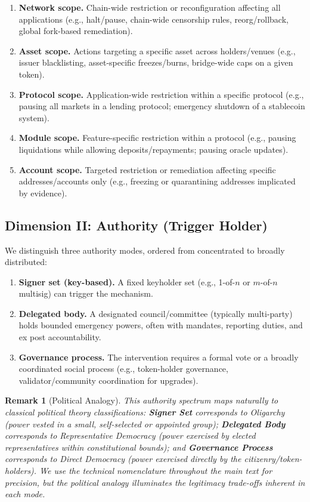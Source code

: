 \documentclass[12pt]{article}
\newif\ifconcise
\newtheorem{remark}{Remark}
\begin{document}
\begin{enumerate}
    \item \textbf{Network scope.} Chain-wide restriction or reconfiguration affecting all applications (e.g., halt/pause, chain-wide censorship rules, reorg/rollback, global fork-based remediation).
    \item \textbf{Asset scope.} Actions targeting a specific asset across holders/venues (e.g., issuer blacklisting, asset-specific freezes/burns, bridge-wide caps on a given token).
    \item \textbf{Protocol scope.} Application-wide restriction within a specific protocol (e.g., pausing all markets in a lending protocol; emergency shutdown of a stablecoin system).
    \item \textbf{Module scope.} Feature-specific restriction within a protocol (e.g., pausing liquidations while allowing deposits/repayments; pausing oracle updates).
    \item \textbf{Account scope.} Targeted restriction or remediation affecting specific addresses/accounts only (e.g., freezing or quarantining addresses implicated by evidence).
\end{enumerate}


\subsection{Dimension II: Authority (Trigger Holder)}
\label{sec:taxonomy-authority}

We distinguish three authority modes, ordered from concentrated to broadly distributed:

\begin{enumerate}
    \item \textbf{Signer set (key-based).} A fixed keyholder set (e.g., 1-of-$n$ or $m$-of-$n$ multisig) can trigger the mechanism.
    \item \textbf{Delegated body.} A designated council/committee (typically multi-party) holds bounded emergency powers, often with mandates, reporting duties, and ex post accountability.
    \item \textbf{Governance process.} The intervention requires a formal vote or a broadly coordinated social process (e.g., token-holder governance, validator/community coordination for upgrades).
\end{enumerate}

\ifconcise\else
\begin{remark}[Political Analogy]
This authority spectrum maps naturally to classical political theory classifications: \textbf{Signer Set} corresponds to \emph{Oligarchy} (power vested in a small, self-selected or appointed group); \textbf{Delegated Body} corresponds to \emph{Representative Democracy} (power exercised by elected representatives within constitutional bounds); and \textbf{Governance Process} corresponds to \emph{Direct Democracy} (power exercised directly by the citizenry/token-holders). We use the technical nomenclature throughout the main text for precision, but the political analogy illuminates the legitimacy trade-offs inherent in each mode.
\end{remark}
\fi
\end{document}
